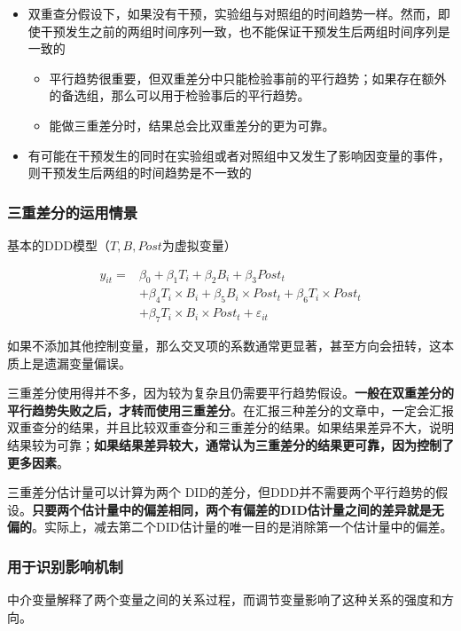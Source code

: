 \documentclass[11pt,a4paper]{ctexart}
\newcommand{\ba}{\begin{aligned}}
\newcommand{\ea}{\end{aligned}}
\newcommand{\ve}{\varepsilon}
\begin{document}
\begin{itemize}
\item
  双重查分假设下，如果没有干预，实验组与对照组的时间趋势一样。然而，即使干预发生之前的两组时间序列一致，也不能保证干预发生后两组时间序列是一致的

  \begin{itemize}
  \item
    平行趋势很重要，但双重差分中只能检验事前的平行趋势；如果存在额外的备选组，那么可以用于检验事后的平行趋势。
  \item
    能做三重差分时，结果总会比双重差分的更为可靠。
  \end{itemize}
\item
  有可能在干预发生的同时在实验组或者对照组中又发生了影响因变量的事件，则干预发生后两组的时间趋势是不一致的
\end{itemize}

\subsubsection{三重差分的运用情景}

基本的DDD模型（\(T,B,Post\)为虚拟变量）

\[\ba
y_{it}=& \beta_0+\beta_1 T_{i}+\beta_2 B_{i}+\beta_3 Post_{t}\\
& + \beta_4 T_i\times B_i + \beta_5 B_i\times Post_t+\beta_6 T_i\times Post_t\\
& + \beta_7 T_i\times B_i \times Post_t +\ve_{it}
\ea\]

如果不添加其他控制变量，那么交叉项的系数通常更显著，甚至方向会扭转，这本质上是遗漏变量偏误。

三重差分使用得并不多，因为较为复杂且仍需要平行趋势假设。\textbf{一般在双重差分的平行趋势失败之后，才转而使用三重差分}。在汇报三种差分的文章中，一定会汇报双重查分的结果，并且比较双重查分和三重差分的结果。如果结果差异不大，说明结果较为可靠；\textbf{如果结果差异较大，通常认为三重差分的结果更可靠，因为控制了更多因素}。

三重差分估计量可以计算为两个
DID的差分，但DDD并不需要两个平行趋势的假设。\textbf{只要两个估计量中的偏差相同，两个有偏差的DID估计量之间的差异就是无偏的}。实际上，减去第二个DID估计量的唯一目的是消除第一个估计量中的偏差。

\subsubsection{用于识别影响机制}

中介变量解释了两个变量之间的关系过程，而调节变量影响了这种关系的强度和方向。
\end{document}
